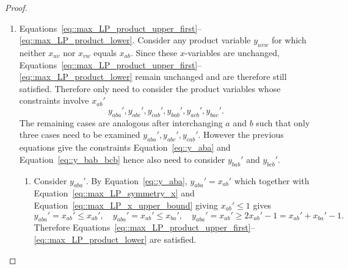 \documentclass[11pt]{article}
\begin{document}
\begin{proof}
\begin{enumerate}[label=\Alph*.]
\begin{enumerate}[label=(\roman*)]
          \[
          1 \leq z_{bc}' = \sum_{k\in\{a,b,c\}}y_{bkc}'+x_{bc}' =y_{bac}'+y_{bbc}'+y_{bcc}'+x_{bc}'=y_{bac}'+x_{bc}',
          \]
          since Equations~\eqref{eq::max_LP_product_upper_first}--\eqref{eq::max_LP_product_upper_second} together with Equation~\eqref{eq::max_LP_diagonal_x} imply $y_{bbc}'=y_{bcc}'=0$. As $x_{bc}'=x_{bc}$, $y_{bac}' = y_{bac}$ satisfies the new equation, no additional constraints are needed. 
        \item Since $g_{ac}=0$, Equations~\eqref{eq::max_LP_indicator_upper}--\eqref{eq::max_LP_indicator_lower} imply $z_{ac}'=0$. Hence, by Equation~\eqref{eq::max_LP_indicator_arg},
          \[
          0=z_{ac}'=\sum_{k\in\{a,b,c\}}y_{akc}'+x_{ac}'=y_{aac}'+y_{abc}'+y_{acc}'+x_{ac}'=y_{abc}',
          \]
          since $y_{aac}'=y_{acc}'=0$ by Equations~\eqref{eq::max_LP_product_upper_first}--\eqref{eq::max_LP_product_upper_second}, and $x_{ac}'=0$ by Lemma~\ref{lemma::two_edges_linear_sum}. Therefore $y_{abc}'=y_{abc} = 0$ which is unchanged from the original feasible solution.  
      \end{enumerate}
    \item Equations~\eqref{eq::max_LP_product_upper_first}--\eqref{eq::max_LP_product_lower}. Consider any product variable $y_{uvw}$ for which neither $x_{uv}$ nor $x_{vw}$ equals $x_{ab}$. Since these $x$-variables are unchanged, Equations~\eqref{eq::max_LP_product_upper_first}--\eqref{eq::max_LP_product_lower} remain unchanged and are therefore still satisfied. Therefore only need to consider the product variables whose constraints involve $x_{ab}'$
    \[
    y_{aba}',y_{abc}',y_{cab}',y_{bab}',y_{acb}',y_{bac}'. 
    \]
    The remaining cases are analogous after interchanging $a$ and $b$ such that only three cases need to be examined $y_{aba}',y_{abc}',y_{cab}'$. However the previous equations give the constraints Equation~\eqref{eq::y_aba} and Equation~\eqref{eq::y_bab_bcb} hence also need to consider $y_{bab}'$ and $y_{bcb}'$. 
      \begin{enumerate}[label=(\roman*)]
        \item Consider $y_{aba}'$. By Equation~\eqref{eq::y_aba}, $y_{aba}'=x_{ab}'$ which together with Equation~\eqref{eq::max_LP_symmetry_x} and Equation~\eqref{eq::max_LP_x_upper_bound} giving $x_{ab}' \leq 1$ gives
          \[
          y_{aba}'=x_{ab}' \leq x_{ab}',\quad y_{aba}'=x_{ab}'\leq x_{ba}', \quad y_{aba}'=x_{ab}' \geq 2x_{ab}'-1 =x_{ab}'+x_{ba}'-1. 
          \]
          Therefore Equations~\eqref{eq::max_LP_product_upper_first}--\eqref{eq::max_LP_product_lower} are satisfied.

\end{enumerate}
\end{enumerate}
\end{proof}
\end{document}
